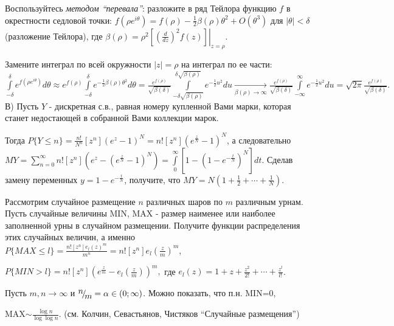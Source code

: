 \begin{ordre}
Воспользуйтесь \textit{методом ``перевала''}: разложите в ряд Тейлора функцию $f$ в окрестности седловой 
точки: $f(\rho e^{i\theta })=f(\rho )-\frac{1}{2}\beta (\rho )\theta 
^2+O(\theta ^3)$ для $\left| \theta \right|<\delta $ (разложение Тейлора), 
где $\beta (\rho )=\rho ^2\left. {\left[ {\left( {\frac{d}{dz}} 
\right)^2f(z)} \right]} \right|_{z=\rho } $.

Замените интеграл по всей окружности $\vert z\vert =\rho $ на интеграл по ее 
части: $\int\limits_{-\delta }^\delta {e^{f(\rho e^{i\theta })}d\theta } 
\approx e^{f(\rho )}\int\limits_{-\delta }^\delta {e^{-\frac{1}{2}\beta 
(\rho )\theta ^2}d\theta } =\frac{e^{f(\rho )}}{\sqrt {\beta (\delta )} 
}\int\limits_{-\delta \sqrt {\beta (\rho )} }^{\delta \sqrt {\beta (\rho )} 
} {e^{-\frac{1}{2}u^2}du} \mathop \to \limits_{\beta (\rho )\to \infty } 
\frac{e^{f(\rho )}}{\sqrt {\beta (\delta )} }\int\limits_{-\infty }^\infty 
{e^{-\frac{1}{2}u^2}du} =\sqrt {2\pi } \frac{e^{f(\rho )}}{\sqrt {\beta 
(\delta )} }.$В) Пусть $Y$ - дискретная с.в., равная номеру купленной Вами 
марки, которая станет недостающей в собранной Вами коллекции марок.

Тогда $P\{Y\le n\}=\frac{n!}{N^n}\left[ {z^n} \right](e^z-1)^N=n!\left[ 
{z^n} \right](e^{\frac{z}{N}}-1)^N$, а следовательно 
$MY=\sum\limits_{n=0}^\infty {n!\left[ {z^n} \right]\left( 
{e^z-(e^{\frac{z}{N}}-1)^N} \right)} =\int\limits_0^\infty {\left[ 
{1-(1-e^{-\frac{t}{N}})^N} \right]} dt$. Сделав замену переменных 
$y=1-e^{-\frac{t}{N}}$, получите, что $MY=N\left( {1+\frac{1}{2}+\cdots 
+\frac{1}{N}} \right)$.

\end{ordre}

\begin{problem}

Рассмотрим случайное размещение $n$ различных шаров по $m$ различным урнам. 
Пусть случайные величины MIN, MAX - размер наименее или наиболее заполненной 
урны в случайном размещении. Получите функции распределения этих случайных 
величин, а именно $P\{MAX\le l\}=\frac{n!\left[ {z^n} \right]e_l 
(z)^m}{m^n}=n!\left[ {z^n} \right]e_l \left( {\frac{z}{m}} \right)^m$,

$P\{MIN>l\}=n!\left[ {z^n} \right]\left( {e^{\frac{z}{m}}-e_l \left( 
{\frac{z}{m}} \right)} \right)^m,$ где $e_l (z)=1+z+\frac{z^2}{2!}+\cdots 
+\frac{z^l}{l!}$.

\end{problem}

\begin{remark}

 Пусть $m,n\to \infty $ и $\raise0.7ex\hbox{$n$} \!\mathord{\left/ 
{\vphantom {n 
m}}\right.\kern-\nulldelimiterspace}\!\lower0.7ex\hbox{$m$}=\alpha \in 
\left( {0;\infty } \right)$. Можно показать, что п.н. MIN=0, 

MAX$\sim \frac{\log n}{\log \log n}$. (см. Колчин, Севастьянов, Чистяков 
``Случайные размещения'')

\end{remark}

